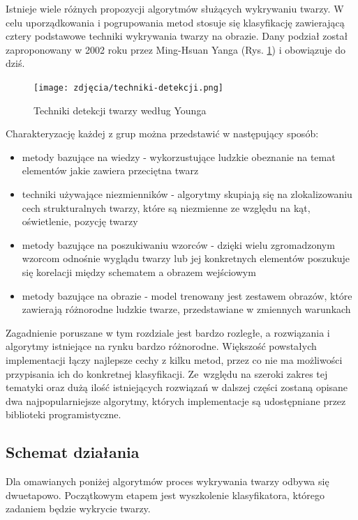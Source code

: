 Istnieje wiele różnych propozycji algorytmów służących wykrywaniu twarzy. W celu uporządkowania i pogrupowania metod stosuje się klasyfikację zawierającą cztery podstawowe techniki wykrywania twarzy na obrazie. Dany podział został zaproponowany w 2002 roku przez Ming-Hsuan Yanga (Rys. \ref{fig:detectionMethods}) i obowiązuje do dziś.

\begin{figure}[h]
	\centering
	\texttt{[image: zdjęcia/techniki-detekcji.png]}
	\caption{Techniki detekcji twarzy według Younga} 
	\label{fig:detectionMethods}
\end{figure}

Charakteryzację każdej z grup \cite{Yang} można przedstawić w następujący sposób:
\begin{itemize}
    \item metody bazujące na wiedzy - wykorzustujące ludzkie obeznanie na temat elementów jakie zawiera przeciętna twarz
    \item techniki używające niezmienników - algorytmy skupiają się na zlokalizowaniu cech strukturalnych twarzy, które są niezmienne ze względu na kąt, oświetlenie, pozycję twarzy
    \item metody bazujące na poszukiwaniu wzorców - dzięki wielu zgromadzonym wzorcom odnośnie wyglądu twarzy lub jej konkretnych elementów poszukuje się korelacji między schematem a obrazem wejściowym
    \item metody bazujące na obrazie - model trenowany jest zestawem obrazów, które zawierają różnorodne ludzkie twarze, przedstawiane w zmiennych warunkach
\end{itemize}

Zagadnienie poruszane w tym rozdziale jest bardzo rozległe, a rozwiązania i algorytmy istniejące na rynku bardzo różnorodne. Większość powstałych implementacji łączy najlepsze cechy z kilku metod, przez co nie ma możliwości przypisania ich do konkretnej klasyfikacji. Ze~względu na szeroki zakres tej 
tematyki oraz dużą ilość istniejących rozwiązań w dalszej części zostaną opisane dwa najpopularniejsze algorytmy, których implementacje są udostępniane przez biblioteki programistyczne.


\subsection{Schemat działania}
Dla omawianych poniżej algorytmów proces wykrywania twarzy odbywa się dwuetapowo. Początkowym etapem jest wyszkolenie klasyfikatora, którego zadaniem będzie wykrycie twarzy. 

